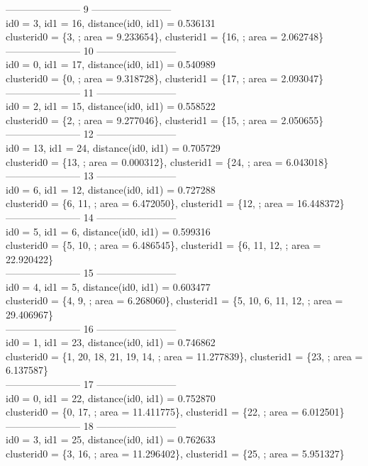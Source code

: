 \documentclass[a4paper,12pt, titlepage]{article}
\begin{document}
-----------------------    9    ------------------------\\
id0 = 3, id1 = 16, distance(id0, id1) = 0.536131\\
clusterid0 = \{3, ; area = 9.233654\}, clusterid1 = \{16, ; area = 2.062748\}\\
-----------------------    10    ------------------------\\
id0 = 0, id1 = 17, distance(id0, id1) = 0.540989\\
clusterid0 = \{0, ; area = 9.318728\}, clusterid1 = \{17, ; area = 2.093047\}\\
-----------------------    11    ------------------------\\
id0 = 2, id1 = 15, distance(id0, id1) = 0.558522\\
clusterid0 = \{2, ; area = 9.277046\}, clusterid1 = \{15, ; area = 2.050655\}\\
-----------------------    12    ------------------------\\
id0 = 13, id1 = 24, distance(id0, id1) = 0.705729\\
clusterid0 = \{13, ; area = 0.000312\}, clusterid1 = \{24, ; area = 6.043018\}\\
-----------------------    13    ------------------------\\
id0 = 6, id1 = 12, distance(id0, id1) = 0.727288\\
clusterid0 = \{6, 11, ; area = 6.472050\}, clusterid1 = \{12, ; area = 16.448372\}\\
-----------------------    14    ------------------------\\
id0 = 5, id1 = 6, distance(id0, id1) = 0.599316\\
clusterid0 = \{5, 10, ; area = 6.486545\}, clusterid1 = \{6, 11, 12, ; area = 22.920422\}\\
-----------------------    15    ------------------------\\
id0 = 4, id1 = 5, distance(id0, id1) = 0.603477\\
clusterid0 = \{4, 9, ; area = 6.268060\}, clusterid1 = \{5, 10, 6, 11, 12, ; area = 29.406967\}\\
-----------------------    16    ------------------------\\
id0 = 1, id1 = 23, distance(id0, id1) = 0.746862\\
clusterid0 = \{1, 20, 18, 21, 19, 14, ; area = 11.277839\}, clusterid1 = \{23, ; area = 6.137587\}\\
-----------------------    17    ------------------------\\
id0 = 0, id1 = 22, distance(id0, id1) = 0.752870\\
clusterid0 = \{0, 17, ; area = 11.411775\}, clusterid1 = \{22, ; area = 6.012501\}\\
-----------------------    18    ------------------------\\
id0 = 3, id1 = 25, distance(id0, id1) = 0.762633\\
clusterid0 = \{3, 16, ; area = 11.296402\}, clusterid1 = \{25, ; area = 5.951327\}\\
\end{document}
